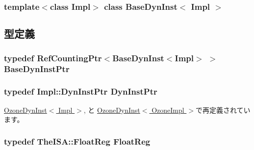 \subsubsection*{template$<$class Impl$>$ class BaseDynInst$<$ Impl $>$}



\subsection{型定義}
\hypertarget{classBaseDynInst_ab1bbb895c1fee69912972ee66ed93c18}{
\subsubsection[{BaseDynInstPtr}]{\setlength{\rightskip}{0pt plus 5cm}typedef {\bf RefCountingPtr}$<${\bf BaseDynInst}$<$Impl$>$ $>$ {\bf BaseDynInstPtr}}}
\label{classBaseDynInst_ab1bbb895c1fee69912972ee66ed93c18}
\hypertarget{classBaseDynInst_a028ce10889c5f6450239d9e9a7347976}{
\subsubsection[{DynInstPtr}]{\setlength{\rightskip}{0pt plus 5cm}typedef Impl::DynInstPtr {\bf DynInstPtr}}}
\label{classBaseDynInst_a028ce10889c5f6450239d9e9a7347976}


\hyperlink{classOzoneDynInst_a028ce10889c5f6450239d9e9a7347976}{OzoneDynInst$<$ Impl $>$}, と \hyperlink{classOzoneDynInst_a028ce10889c5f6450239d9e9a7347976}{OzoneDynInst$<$ OzoneImpl $>$}で再定義されています。\hypertarget{classBaseDynInst_a75484259f1855aabc8d74c6eb1cfe186}{
\subsubsection[{FloatReg}]{\setlength{\rightskip}{0pt plus 5cm}typedef TheISA::FloatReg {\bf FloatReg}}}
\label{classBaseDynInst_a75484259f1855aabc8d74c6eb1cfe186}


